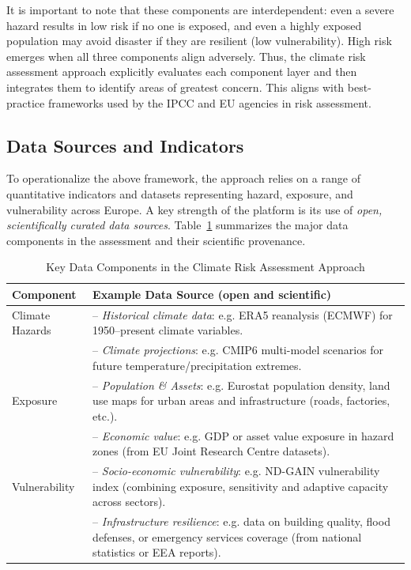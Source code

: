 \documentclass[10pt, conference]{IEEEtran}
\begin{document}
It is important to note that these components are interdependent: even a severe hazard results in low risk if no one is exposed, and even a highly exposed population may avoid disaster if they are resilient (low vulnerability). High risk emerges when all three components align adversely. Thus, the climate risk assessment approach explicitly evaluates each component layer and then integrates them to identify areas of greatest concern. This aligns with best-practice frameworks used by the IPCC and EU agencies in risk assessment.

\subsection{Data Sources and Indicators}
To operationalize the above framework, the approach relies on a range of quantitative indicators and datasets representing hazard, exposure, and vulnerability across Europe. A key strength of the platform is its use of \textit{open, scientifically curated data sources}. Table~\ref{tab:data} summarizes the major data components in the assessment and their scientific provenance.

\begin{table}[ht]
\caption{Key Data Components in the Climate Risk Assessment Approach}
\label{tab:data}
\centering
\begin{tabular}{p{3.2cm} p{4.8cm}}
\hline
\textbf{Component} & \textbf{Example Data Source (open and scientific)} \\
\hline
Climate Hazards & -- \textit{Historical climate data}: e.g. ERA5 reanalysis (ECMWF) for 1950–present climate variables.\\ 
 & -- \textit{Climate projections}: e.g. CMIP6 multi-model scenarios for future temperature/precipitation extremes.\\
\hline
Exposure & -- \textit{Population \& Assets}: e.g. Eurostat population density, land use maps for urban areas and infrastructure (roads, factories, etc.).\\ 
 & -- \textit{Economic value}: e.g. GDP or asset value exposure in hazard zones (from EU Joint Research Centre datasets).\\
\hline
Vulnerability & -- \textit{Socio-economic vulnerability}: e.g. ND-GAIN vulnerability index (combining exposure, sensitivity and adaptive capacity across sectors).\\ 
 & -- \textit{Infrastructure resilience}: e.g. data on building quality, flood defenses, or emergency services coverage (from national statistics or EEA reports).\\
\hline
\end{tabular}
\end{table}
\end{document}
